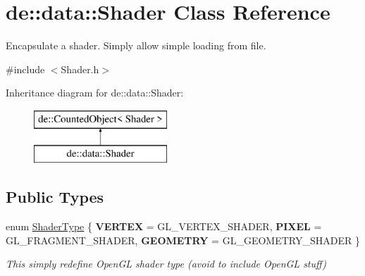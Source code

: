 \hypertarget{classde_1_1data_1_1_shader}{
\section{de\-:\-:data\-:\-:\-Shader \-Class \-Reference}
\label{classde_1_1data_1_1_shader}
}


\-Encapsulate a shader. \-Simply allow simple loading from file.  




{\ttfamily \#include $<$\-Shader.\-h$>$}

\-Inheritance diagram for de\-:\-:data\-:\-:\-Shader\-:\begin{figure}[H]
\begin{center}
\leavevmode
\includegraphics[height=2.000000cm]{classde_1_1data_1_1_shader}
\end{center}
\end{figure}
\subsection*{\-Public \-Types}
\begin{DoxyCompactItemize}
\item 
enum \hyperlink{classde_1_1data_1_1_shader_a51d5bfadf16d2268280b5ffc0ee0ca82}{\-Shader\-Type} \{ {\bfseries \-V\-E\-R\-T\-E\-X} =  \-G\-L\-\_\-\-V\-E\-R\-T\-E\-X\-\_\-\-S\-H\-A\-D\-E\-R, 
{\bfseries \-P\-I\-X\-E\-L} =  \-G\-L\-\_\-\-F\-R\-A\-G\-M\-E\-N\-T\-\_\-\-S\-H\-A\-D\-E\-R, 
{\bfseries \-G\-E\-O\-M\-E\-T\-R\-Y} =  \-G\-L\-\_\-\-G\-E\-O\-M\-E\-T\-R\-Y\-\_\-\-S\-H\-A\-D\-E\-R
 \}
\begin{DoxyCompactList}\small\item\em \-This simply redefine \-Open\-G\-L shader type (avoid to include \-Open\-G\-L stuff) \end{DoxyCompactList}\end{DoxyCompactItemize}
